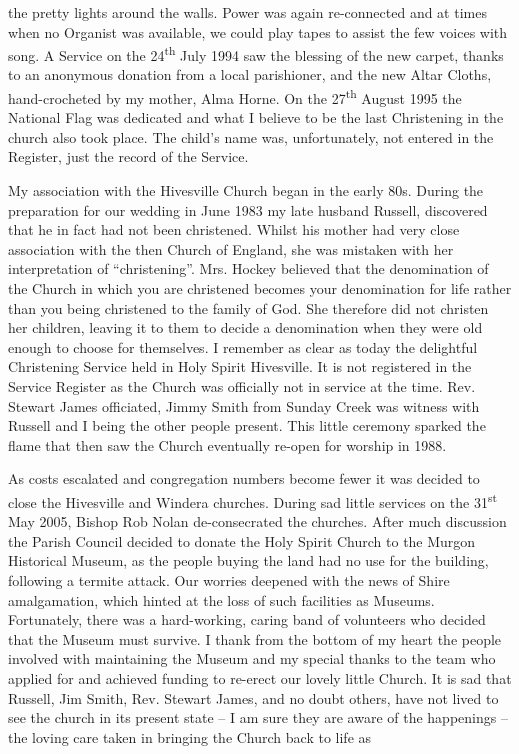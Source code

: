 the pretty lights around the walls. Power was again re-connected and at times when no Organist was available, we could play tapes to assist the few voices with song. A Service on the 24\textsuperscript{th} July 1994 saw the blessing of the new carpet, thanks to an anonymous donation from a local parishioner, and the new Altar Cloths, hand-crocheted by my mother, Alma Horne. On the 27\textsuperscript{th} August 1995 the National Flag was dedicated and what I believe to be the last Christening in the church also took place. The child's name was, unfortunately, not entered in the Register, just the record of the Service.

My association with the Hivesville Church began in the early 80s. During the preparation for our wedding in June 1983 my late husband Russell, discovered that he in fact had not been christened. Whilst his mother had very close association with the then Church of England, she was mistaken with her interpretation of ``christening''. Mrs. Hockey believed that the denomination of the Church in which you are christened becomes your denomination for life rather than you being christened to the family of God. She therefore did not christen her children, leaving it to them to decide a denomination when they were old enough to choose for themselves. I remember as clear as today the delightful Christening Service held in Holy Spirit Hivesville. It is not registered in the Service Register as the Church was officially not in service at the time. Rev. Stewart James officiated, Jimmy Smith from Sunday Creek was witness with Russell and I being the other people present. This little ceremony sparked the flame that then saw the Church eventually re-open for worship in 1988.

As costs escalated and congregation numbers become fewer it was decided to close the Hivesville and Windera churches. During sad little services on the 31\textsuperscript{st} May 2005, Bishop Rob Nolan de-consecrated the churches. After much discussion the Parish Council decided to donate the Holy Spirit Church to the Murgon Historical Museum, as the people buying the land had no use for the building, following a termite attack. Our worries deepened with the news of Shire amalgamation, which hinted at the loss of such facilities as Museums. Fortunately, there was a hard-working, caring band of volunteers who decided that the Museum must survive. I thank from the bottom of my heart the people involved with maintaining the Museum and my special thanks to the team who applied for and achieved funding to re-erect our lovely little Church. It is sad that Russell, Jim Smith, Rev. Stewart James, and no doubt others, have not lived to see the church in its present state -- I am sure they are aware of the happenings -- the loving care taken in bringing the Church back to life as

